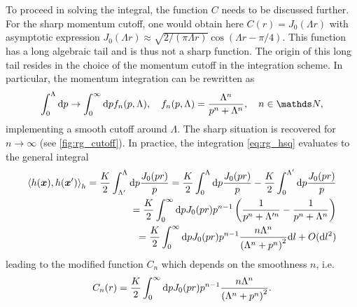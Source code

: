 To proceed in solving the integral, the function $C$ needs to be discussed further.
For the sharp momentum cutoff, one would obtain here $C(r) = J_0(\Lambda r)$ with asymptotic expression $J_0(\Lambda r)\approx\sqrt{2/(\pi \Lambda r)}\cos(\Lambda r-\pi/4)$.
This function has a long algebraic tail and is thus not a sharp function.
The origin of this long tail resides in the choice of the momentum cutoff in the integration scheme.
In particular, the momentum integration can be rewritten as
\begin{align}
    \int_{0}^{\Lambda}\rd p \rightarrow \int_{0}^\infty\rd p f_n(p,\Lambda),
    \quad
    f_n(p,\Lambda) = \frac{\Lambda^n}{p^n+\Lambda^n},
    \quad
    n\in\mathds N,
    \label{eq:integral_cutoff}
\end{align}
implementing a smooth cutoff around $\Lambda$.
The sharp situation is recovered for $n\rightarrow\infty$ (see \cref{fig:rg_cutoff}).
In practice, the integration \cref{eq:rg_hsq} evaluates to the general integral
\begin{align}
    \braket{h({\bm x}),h(\bm x')}_h = \frac K2\int_{\Lambda'}^\Lambda\mathrm d p\frac{J_0(p r)}{p} = \frac K2\int_{0}^\Lambda\mathrm d p\frac{J_0(p r)}{p}
    -\frac K2\int_{0}^{\Lambda'}\mathrm d p\frac{J_0(p r)}{p}
    \\
    =
    \frac K2\int_{0}^\infty\mathrm d p J_0(p r)p^{n-1}\left( \frac1{p^n+\Lambda'^n}-\frac1{p^n+\Lambda^n} \right)
    \\
    =
    \frac K2\int_{0}^\infty\mathrm d p J_0(p r)p^{n-1}\frac{n\Lambda^n}{\left(\Lambda^n+p^n\right)^2}\mathrm d l + O(\mathrm d l^2)
    \label{eq:rg_hxhxpr}
\end{align}
leading to the modified function $C_n$ which depends on the smoothness $n$, i.e.
\begin{align}
    C_n(r)
    =
    \frac K2\int_{0}^\infty\mathrm d p J_0(p r)p^{n-1}\frac{n\Lambda^n}{\left(\Lambda^n+p^n\right)^2}.
    \label{eq:rg_cn_def}
\end{align}
